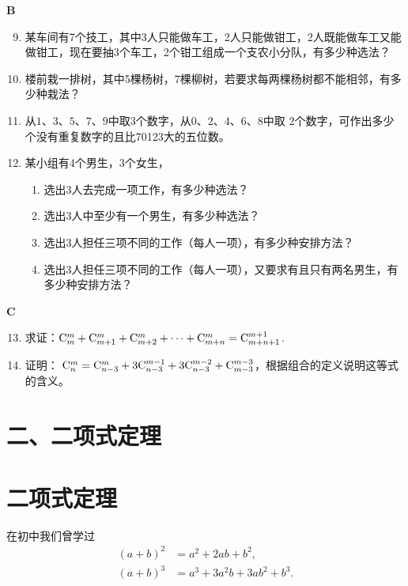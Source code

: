 \begin{center}
    \bfseries B
\end{center}

\begin{enumerate}
 \setcounter{enumi}{8}   
 \item 某车间有7个技工，其中3人只能做车工，2人只能做钳工，2人既能做车工又能做钳工，现在要抽3个车工，2个钳工组成一个支农小分队，有多少种选法？
 \item 楼前栽一排树，其中5棵杨树，7棵柳树，若要求每两棵杨树都不能相邻，有多少种栽法？
 \item 从$1$、$3$、$5$、$7$、$9$中取3个数字，从$0$、$2$、$4$、$6$、$8$中取 2个数字，可作出多少个没有重复数字的且比70123大的五位数。
 \item 某小组有4个男生，3个女生，
\begin{enumerate}[(1)]
 \item 选出3人去完成一项工作，有多少种选法？
    \item 选出3人中至少有一个男生，有多少种选法？
    \item 选出3人担任三项不同的工作（每人一项），有多少种安排方法？
    \item 选出3人担任三项不同的工作（每人一项），又要求有且只有两名男生，有多少种安排方法？
\end{enumerate}
\end{enumerate}

\begin{center}
    \bfseries C
\end{center}

\begin{enumerate}
  \setcounter{enumi}{12}  
  \item 求证：$ \comb{m}{m}+\comb{m+1}{m}+\comb{m+2}{m}+\cdots+\comb{m+n}{m}=\comb{m+n+1}{m+1}$.

  \item 证明： $\comb{n}{m}=\comb{n-3}{m}+3\comb{n-3}{m-1}+3\comb{n-3}{m-2}+\comb{m-3}{m-3}$，根据组合的定义说明这等式的含义。
\end{enumerate}


\section*{二、二项式定理}

\section{二项式定理}

在初中我们曾学过
\[\begin{split}
(a+b)^{2}&=a^{2}+2ab+b^{2},\\
(a+b)^{3}&=a^{3}+3a^{2}b+3ab^{2}+b^{3}.    
\end{split}\]

